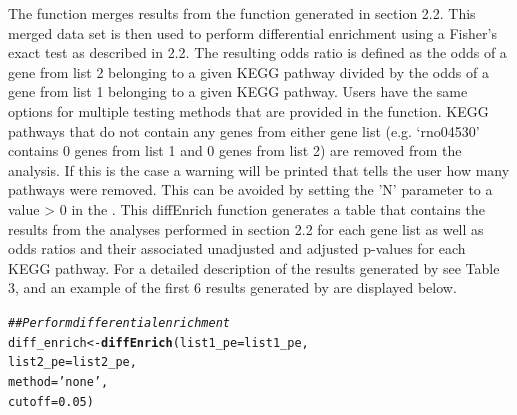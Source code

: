 \documentclass[article]{jss}\usepackage[]{graphicx}\usepackage[]{color}
\makeatletter
\newcommand{\hlnum}[1]{\textcolor[rgb]{0.686,0.059,0.569}{#1}}%
\newcommand{\hlstr}[1]{\textcolor[rgb]{0.192,0.494,0.8}{#1}}%
\newcommand{\hlcom}[1]{\textcolor[rgb]{0.678,0.584,0.686}{\textit{#1}}}%
\newcommand{\hlstd}[1]{\textcolor[rgb]{0.345,0.345,0.345}{#1}}%
\newcommand{\hlkwb}[1]{\textcolor[rgb]{0.69,0.353,0.396}{#1}}%
\newcommand{\hlkwc}[1]{\textcolor[rgb]{0.333,0.667,0.333}{#1}}%
\newcommand{\hlkwd}[1]{\textcolor[rgb]{0.737,0.353,0.396}{\textbf{#1}}}%
\newenvironment{kframe}{%
 \def\at@end@of@kframe{}%
 \ifinner\ifhmode%
  \def\at@end@of@kframe{\end{minipage}}%
  \begin{minipage}{\columnwidth}%
 \fi\fi%
 \def\FrameCommand##1{\hskip\@totalleftmargin \hskip-\fboxsep
 \colorbox{shadecolor}{##1}\hskip-\fboxsep
     \hskip-\linewidth \hskip-\@totalleftmargin \hskip\columnwidth}%
 \MakeFramed {\advance\hsize-\width
   \@totalleftmargin\z@ \linewidth\hsize
   \@setminipage}}%
 {\par\unskip\endMakeFramed%
 \at@end@of@kframe}
\newenvironment{knitrout}{}{} %
\makeatother
\begin{document}
The  function merges results from the  function
generated in section 2.2. This merged data set is then used to perform differential
enrichment using a Fisher’s exact test as described in 2.2. The resulting odds
ratio is defined as the odds of a gene from list 2 belonging to a given KEGG
pathway divided by the odds of a gene from list 1 belonging to a given KEGG
pathway. Users have the same options for multiple testing methods that are
provided in the  function. KEGG pathways that do not contain
any genes from either gene list (e.g. ‘rno04530’ contains 0 genes from list 1
and 0 genes from list 2) are removed from the analysis. If this is the case a
warning will be printed that tells the user how many pathways were removed.
This can be avoided by setting the 'N' parameter to a value > 0 in the
. This diffEnrich function generates a table that
contains the results from the analyses performed in section 2.2 for each gene
list as well as odds ratios and their associated unadjusted and adjusted
p-values for each KEGG pathway. For a detailed description of the results
generated by  see Table 3, and an example of the first 6
results generated by  are displayed below.

\begin{knitrout}
\color{fgcolor}\begin{kframe}
\begin{alltt}
\hlcom{## Perform differential enrichment}
\hlstd{diff_enrich} \hlkwb{<-} \hlkwd{diffEnrich}\hlstd{(}\hlkwc{list1_pe} \hlstd{= list1_pe,}
                          \hlkwc{list2_pe} \hlstd{= list2_pe,}
                          \hlkwc{method} \hlstd{=} \hlstr{'none'}\hlstd{,}
                          \hlkwc{cutoff} \hlstd{=} \hlnum{0.05}\hlstd{)}
\end{alltt}
\end{kframe}
\end{knitrout}
\end{document}
